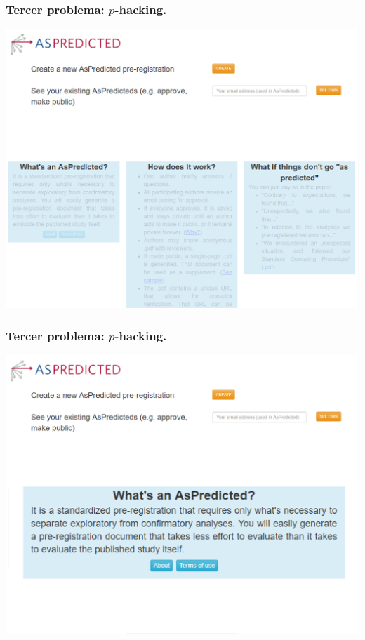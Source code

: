 \documentclass[9pt]{beamer}
\begin{document}
\begin{frame}
  \frametitle{Tercer problema: $p$-hacking.}
  \hspace*{-0.5cm}\includegraphics[height=1.0\textheight]{images/aspredicted_web-0}
\end{frame}
\begin{frame}
  \frametitle{Tercer problema: $p$-hacking.}
    \hspace*{-0.5cm}\includegraphics[height=1.0\textheight]{images/aspredicted_web-1}
\end{frame}
\end{document}
